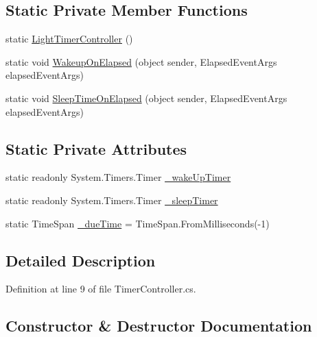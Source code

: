 \subsection*{Static Private Member Functions}
\begin{DoxyCompactItemize}
\item 
static \mbox{\hyperlink{class_master_application_1_1_light_timer_controller_a6aca57a6a6033b49f68d925fbbed7ae0}{Light\+Timer\+Controller}} ()
\item 
static void \mbox{\hyperlink{class_master_application_1_1_light_timer_controller_aec91ddf32845276e02330e446f5c9859}{Wakeup\+On\+Elapsed}} (object sender, Elapsed\+Event\+Args elapsed\+Event\+Args)
\item 
static void \mbox{\hyperlink{class_master_application_1_1_light_timer_controller_af7b0f648c14fad7fd49b687beb1f825d}{Sleep\+Time\+On\+Elapsed}} (object sender, Elapsed\+Event\+Args elapsed\+Event\+Args)
\end{DoxyCompactItemize}
\subsection*{Static Private Attributes}
\begin{DoxyCompactItemize}
\item 
static readonly System.\+Timers.\+Timer \mbox{\hyperlink{class_master_application_1_1_light_timer_controller_a5f247a7435ff4e8e24cbaa1b6e93bd4a}{\+\_\+wake\+Up\+Timer}}
\item 
static readonly System.\+Timers.\+Timer \mbox{\hyperlink{class_master_application_1_1_light_timer_controller_a939efc8b74869f2d28b908deaaee0337}{\+\_\+sleep\+Timer}}
\item 
static Time\+Span \mbox{\hyperlink{class_master_application_1_1_light_timer_controller_a06dd9c3a348e7d71d4433c1ff25aad80}{\+\_\+due\+Time}} = Time\+Span.\+From\+Milliseconds(-\/1)
\end{DoxyCompactItemize}


\subsection{Detailed Description}


Definition at line 9 of file Timer\+Controller.\+cs.



\subsection{Constructor \& Destructor Documentation}
\mbox{\label{class_master_application_1_1_light_timer_controller_a6aca57a6a6033b49f68d925fbbed7ae0}} 
